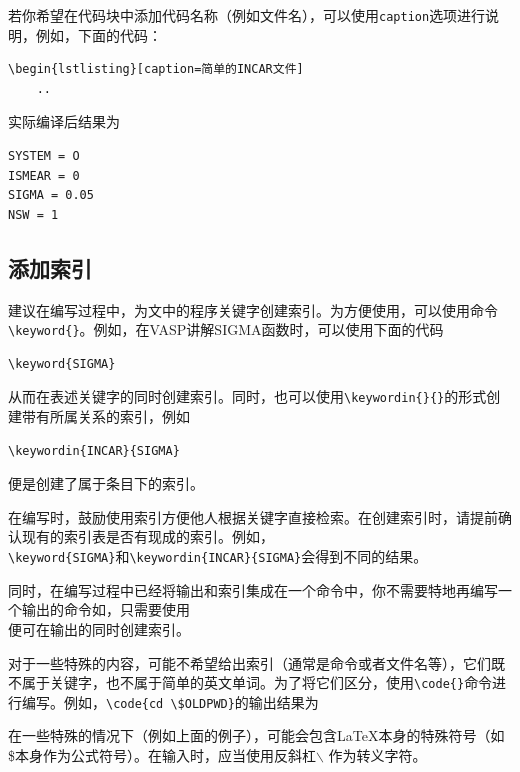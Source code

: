 \begin{attention}
    若你希望在代码块中添加代码名称（例如文件名），可以使用\verb|caption|选项进行说明，例如，下面的代码：
    \begin{lstlisting}[frame=line]
\begin{lstlisting}[caption=简单的INCAR文件]
    ..        
    \end{lstlisting}

    实际编译后结果为
    \begin{lstlisting}[caption=简单的INCAR文件]
SYSTEM = O
ISMEAR = 0
SIGMA = 0.05
NSW = 1
    \end{lstlisting}

\end{attention}

\subsection{添加索引}\label{subsec:关于如何使用LaTeX编写模板-添加索引}

建议在编写过程中，为文中的程序关键字创建索引。为方便使用，可以使用命令\verb|\keyword{}|。例如，在VASP讲解SIGMA函数时，可以使用下面的代码

\begin{lstlisting}[frame=line]
\keyword{SIGMA}
\end{lstlisting}

从而在表述关键字的同时创建索引。同时，也可以使用\verb|\keywordin{}{}|的形式创建带有所属关系的索引，例如

\begin{lstlisting}[frame=line]
\keywordin{INCAR}{SIGMA}
\end{lstlisting}

便是创建了属于条目下的索引。

\begin{attention}
    在编写时，鼓励使用索引方便他人根据关键字直接检索。在创建索引时，请提前确认现有的索引表是否有现成的索引。例如，\\\verb|\keyword{SIGMA}|和\verb|\keywordin{INCAR}{SIGMA}|会得到不同的结果。

    同时，在编写过程中已经将输出和索引集成在一个命令中，你不需要特地再编写一个输出的命令如，只需要使用\\便可在输出的同时创建索引。
\end{attention}

对于一些特殊的内容，可能不希望给出索引（通常是命令或者文件名等），它们既不属于关键字，也不属于简单的英文单词。为了将它们区分，使用\verb|\code{}|命令进行编写。例如，\verb|\code{cd \$OLDPWD}|的输出结果为

\begin{attention}
    在一些特殊的情况下（例如上面的例子），可能会包含\LaTeX 本身的特殊符号（如\$本身作为公式符号）。在输入时，应当使用反斜杠$\backslash$ 作为转义字符。
\end{attention}
